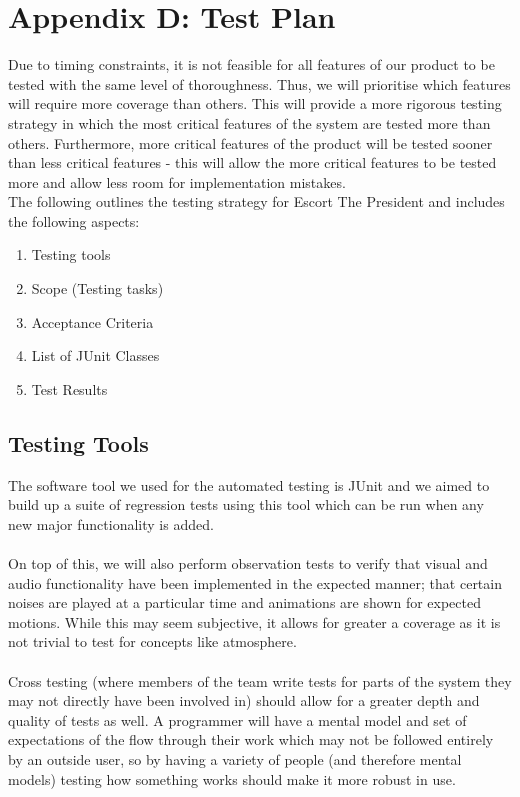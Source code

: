 \documentclass[12pt]{article}
\newcommand{\return}{\\\\\noindent}
\begin{document}
\section{Appendix D: Test Plan}
Due to timing constraints, it is not feasible for all features of our product to be tested with the same level of thoroughness. Thus, we will prioritise which features will require more coverage than others. This will provide a more rigorous testing strategy in which the most critical features of the system are tested more than others. Furthermore, more critical features of the product will be tested sooner than less critical features - this will allow the more critical features to be tested more and allow less room for implementation mistakes.\\
The following outlines the testing strategy for Escort The President and includes the following aspects:
\begin{enumerate}
\item Testing tools
\item Scope (Testing tasks)
\item Acceptance Criteria
\item List of JUnit Classes
\item Test Results
\end{enumerate}
\subsection{Testing Tools}
The software tool we used for the automated testing is JUnit and we aimed to build up a suite of regression tests using this tool which can be run when any new major functionality is added.\return
On top of this, we will also perform observation tests to verify that visual and audio functionality have been implemented in the expected manner; that certain noises are played at a particular time and animations are shown for expected motions. While this may seem subjective, it allows for greater a coverage as it is not trivial to test for concepts like atmosphere.\return
Cross testing (where members of the team write tests for parts of the system they may not directly have been involved in) should allow for a greater depth and quality of tests as well. A programmer will have a mental model and set of expectations of the flow through their work which may not be followed entirely by an outside user, so by having a variety of people (and therefore mental models) testing how something works should make it more robust in use.
\end{document}
